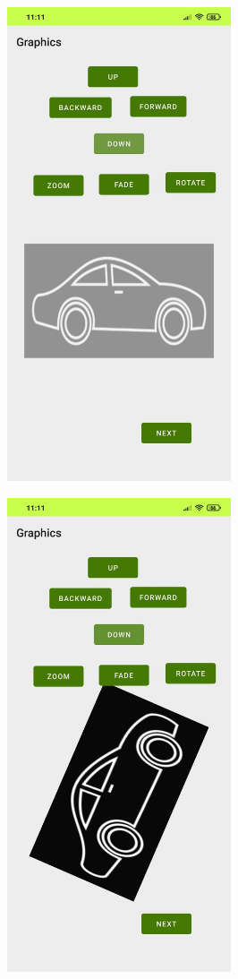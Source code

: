 \documentclass[12pt,letterpaper]{article}
\begin{document}
\begin{figure}
    \centering
    \includegraphics[height=14cm, keepaspectratio]{Outputs/OP7.png}
\end{figure}
\begin{figure}
    \centering
    \includegraphics[height=14cm, keepaspectratio]{Outputs/OP8.png}
\end{figure}
\end{document}

